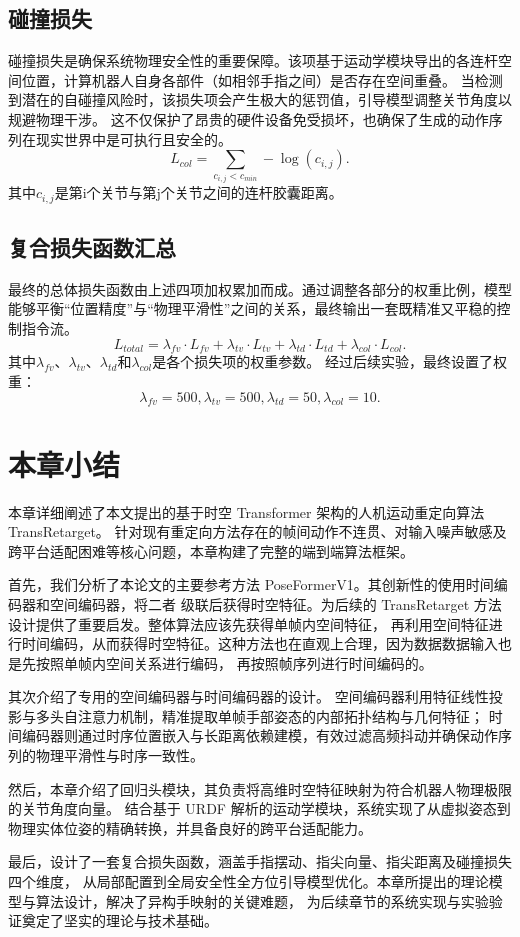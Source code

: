 \subsection{碰撞损失}
碰撞损失是确保系统物理安全性的重要保障。该项基于运动学模块导出的各连杆空间位置，计算机器人自身各部件（如相邻手指之间）是否存在空间重叠。
当检测到潜在的自碰撞风险时，该损失项会产生极大的惩罚值，引导模型调整关节角度以规避物理干涉。
这不仅保护了昂贵的硬件设备免受损坏，也确保了生成的动作序列在现实世界中是可执行且安全的。
\begin{equation}
L_{col} = \sum_{c_{i,j} < c_{min}} -\log(c_{i,j}).
\end{equation}
其中$c_{i,j}$是第i个关节与第j个关节之间的连杆胶囊距离。

\subsection{复合损失函数汇总}
最终的总体损失函数由上述四项加权累加而成。通过调整各部分的权重比例，模型能够平衡“位置精度”与“物理平滑性”之间的关系，最终输出一套既精准又平稳的控制指令流。
\begin{equation}
L_{total}=\lambda_{fv} \cdot L_{fv} + \lambda_{tv} \cdot L_{tv} + \lambda_{td} \cdot L_{td} + \lambda_{col} \cdot L_{col}.
\end{equation}
其中$\lambda_{fv}$、$\lambda_{tv}$、$\lambda_{td}$和$\lambda_{col}$是各个损失项的权重参数。
经过后续实验，最终设置了权重：
\begin{equation}
\lambda_{fv} = 500, \lambda_{tv} = 500, \lambda_{td} = 50, \lambda_{col} = 10.
\end{equation}
\section{本章小结}
本章详细阐述了本文提出的基于时空 Transformer 架构的人机运动重定向算法TransRetarget。
针对现有重定向方法存在的帧间动作不连贯、对输入噪声敏感及跨平台适配困难等核心问题，本章构建了完整的端到端算法框架。

首先，我们分析了本论文的主要参考方法 PoseFormerV1。其创新性的使用时间编码器和空间编码器，将二者
级联后获得时空特征。为后续的 TransRetarget 方法设计提供了重要启发。整体算法应该先获得单帧内空间特征，
再利用空间特征进行时间编码，从而获得时空特征。这种方法也在直观上合理，因为数据数据输入也是先按照单帧内空间关系进行编码，
再按照帧序列进行时间编码的。

其次介绍了专用的空间编码器与时间编码器的设计。
空间编码器利用特征线性投影与多头自注意力机制，精准提取单帧手部姿态的内部拓扑结构与几何特征；
时间编码器则通过时序位置嵌入与长距离依赖建模，有效过滤高频抖动并确保动作序列的物理平滑性与时序一致性。

然后，本章介绍了回归头模块，其负责将高维时空特征映射为符合机器人物理极限的关节角度向量。
结合基于 URDF 解析的运动学模块，系统实现了从虚拟姿态到物理实体位姿的精确转换，并具备良好的跨平台适配能力。

最后，设计了一套复合损失函数，涵盖手指摆动、指尖向量、指尖距离及碰撞损失四个维度，
从局部配置到全局安全性全方位引导模型优化。本章所提出的理论模型与算法设计，解决了异构手映射的关键难题，
为后续章节的系统实现与实验验证奠定了坚实的理论与技术基础。


